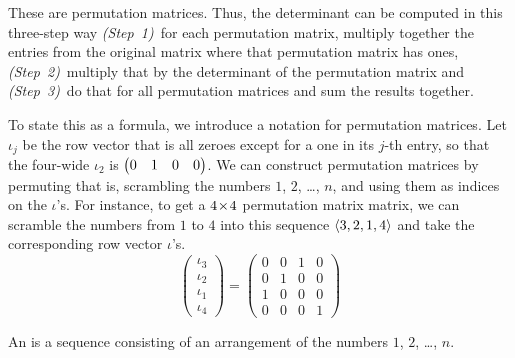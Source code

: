 These are permutation matrices.
Thus, the determinant can be computed in this
three-step way 
\textit{(Step~1)}~for each permutation matrix, multiply together
the entries from the original matrix
where that permutation matrix has ones, 
\textit{(Step~2)}~multiply that by the determinant of the permutation matrix 
and
\textit{(Step~3)}~do that for all permutation matrices 
and sum the results together.

To state this as a formula, we introduce a notation for permutation matrices.
Let $\iota_j$ be the row vector that is all zeroes except for a one in its 
$j$-th entry, so that the four-wide $\iota_2$ is $\begin{pmatrix} 0 &1 &0 &0 \end{pmatrix}$.
We can construct permutation matrices by 
permuting \Dash  that is, scrambling \Dash  the numbers $1$, $2$, \ldots, $n$,
and using them as indices on the $\iota$'s.
For instance, to get a \( 4 \! \times \! 4 \) permutation matrix
matrix, we can scramble the numbers from $1$ to $4$ into 
this sequence \( \langle3,2,1,4\rangle \) and take the corresponding 
row vector $\iota$'s.
\begin{equation*}
   \begin{pmatrix}
      \iota_{3} \\
      \iota_{2} \\
      \iota_{1} \\
      \iota_{4} 
   \end{pmatrix}=
  \begin{pmatrix}
     0  &0  &1  &0  \\
     0  &1  &0  &0  \\
     1  &0  &0  &0  \\
     0  &0  &0  &1
  \end{pmatrix}
\end{equation*}

\begin{definition}
An 
is a sequence consisting of an arrangement of the numbers 
$1$, $2$, \ldots, $n$.
\end{definition}

